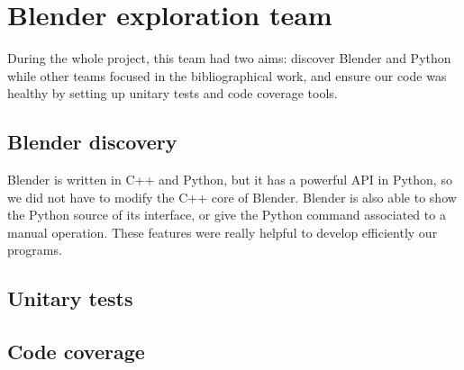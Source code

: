 \section{Blender exploration team}

During the whole project, this team had two aims: discover Blender and
Python while other teams focused in the bibliographical work, and
ensure our code was healthy by setting up unitary tests and code
coverage tools.

\subsection{Blender discovery}

Blender is written in C++ and Python, but it has a powerful API in
Python, so we did not have to modify the C++ core of Blender. Blender
is also able to show the Python source of its interface, or give the
Python command associated to a manual operation. These features were
really helpful to develop efficiently our programs.

\subsection{Unitary tests}


\subsection{Code coverage}